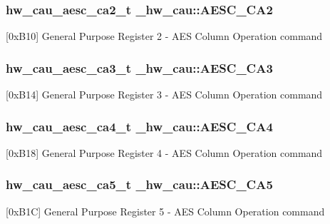 \subsubsection[{\texorpdfstring{A\+E\+S\+C\+\_\+\+C\+A2}{AESC_CA2}}]{ {\bf hw\+\_\+cau\+\_\+aesc\+\_\+ca2\+\_\+t} \+\_\+hw\+\_\+cau\+::\+A\+E\+S\+C\+\_\+\+C\+A2}\hypertarget{struct__hw__cau_a1f9a09c44103a1060ac1f6a79b6705b0}{}\label{struct__hw__cau_a1f9a09c44103a1060ac1f6a79b6705b0}
\mbox{[}0x\+B10\mbox{]} General Purpose Register 2 -\/ A\+ES Column Operation command 
\subsubsection[{\texorpdfstring{A\+E\+S\+C\+\_\+\+C\+A3}{AESC_CA3}}]{ {\bf hw\+\_\+cau\+\_\+aesc\+\_\+ca3\+\_\+t} \+\_\+hw\+\_\+cau\+::\+A\+E\+S\+C\+\_\+\+C\+A3}\hypertarget{struct__hw__cau_a0ca8e371d7763bacb9430e4d63d4ca3e}{}\label{struct__hw__cau_a0ca8e371d7763bacb9430e4d63d4ca3e}
\mbox{[}0x\+B14\mbox{]} General Purpose Register 3 -\/ A\+ES Column Operation command 
\subsubsection[{\texorpdfstring{A\+E\+S\+C\+\_\+\+C\+A4}{AESC_CA4}}]{ {\bf hw\+\_\+cau\+\_\+aesc\+\_\+ca4\+\_\+t} \+\_\+hw\+\_\+cau\+::\+A\+E\+S\+C\+\_\+\+C\+A4}\hypertarget{struct__hw__cau_a2f8f6d2d5ad1b7801b7f25a0b769cbf4}{}\label{struct__hw__cau_a2f8f6d2d5ad1b7801b7f25a0b769cbf4}
\mbox{[}0x\+B18\mbox{]} General Purpose Register 4 -\/ A\+ES Column Operation command 
\subsubsection[{\texorpdfstring{A\+E\+S\+C\+\_\+\+C\+A5}{AESC_CA5}}]{ {\bf hw\+\_\+cau\+\_\+aesc\+\_\+ca5\+\_\+t} \+\_\+hw\+\_\+cau\+::\+A\+E\+S\+C\+\_\+\+C\+A5}\hypertarget{struct__hw__cau_af764fbed9dcfcc8762e39cc910afe3dd}{}\label{struct__hw__cau_af764fbed9dcfcc8762e39cc910afe3dd}
\mbox{[}0x\+B1C\mbox{]} General Purpose Register 5 -\/ A\+ES Column Operation command 
